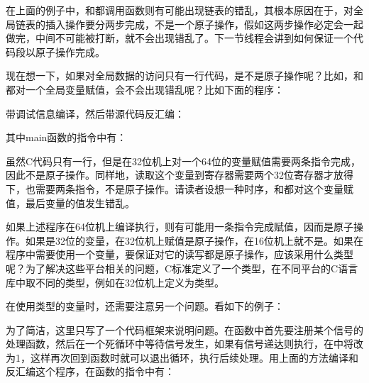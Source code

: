 在上面的例子中，和都调用函数则有可能出现链表的错乱，其根本原因在于，对全局链表的插入操作要分两步完成，不是一个原子操作，假如这两步操作必定会一起做完，中间不可能被打断，就不会出现错乱了。下一节线程会讲到如何保证一个代码段以原子操作完成。



现在想一下，如果对全局数据的访问只有一行代码，是不是原子操作呢？比如，和都对一个全局变量赋值，会不会出现错乱呢？比如下面的程序：




带调试信息编译，然后带源代码反汇编：




其中main函数的指令中有：




虽然C代码只有一行，但是在32位机上对一个64位的变量赋值需要两条指令完成，因此不是原子操作。同样地，读取这个变量到寄存器需要两个32位寄存器才放得下，也需要两条指令，不是原子操作。请读者设想一种时序，和都对这个变量赋值，最后变量的值发生错乱。



如果上述程序在64位机上编译执行，则有可能用一条指令完成赋值，因而是原子操作。如果是32位的变量，在32位机上赋值是原子操作，在16位机上就不是。如果在程序中需要使用一个变量，要保证对它的读写都是原子操作，应该采用什么类型呢？为了解决这些平台相关的问题，C标准定义了一个类型，在不同平台的C语言库中取不同的类型，例如在32位机上定义为类型。



在使用类型的变量时，还需要注意另一个问题。看如下的例子：




为了简洁，这里只写了一个代码框架来说明问题。在函数中首先要注册某个信号的处理函数，然后在一个死循环中等待信号发生，如果有信号递达则执行，在中将改为1，这样再次回到函数时就可以退出循环，执行后续处理。用上面的方法编译和反汇编这个程序，在函数的指令中有：


